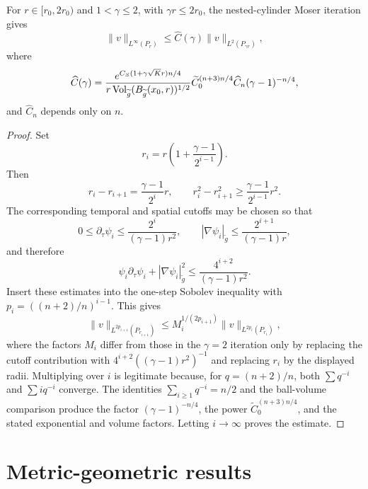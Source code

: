 \begin{proposition}
\label{prop:chow-iii-appj-solution-25-7}


For \(r\in[r_0,2r_0)\) and \(1<\gamma\leq2\), with
\(\gamma r\leq2r_0\), the nested-cylinder Moser iteration gives
\[
 \|v\|_{L^\infty(P_r)}\leq\widehat C(\gamma)
 \|v\|_{L^2(P_{\gamma r})},
\]
where
\[
 \widehat C(\gamma)=
 \frac{e^{C_S(1+\gamma\sqrt K r)n/4}}
 {r\operatorname{Vol}_{\widetilde g}(B_{\widetilde g}(x_0,r))^{1/2}}
 \widetilde C_0^{(n+3)n/4}\widehat C_n(\gamma-1)^{-n/4},
\]
and \(\widehat C_n\) depends only on \(n\).
\end{proposition}
\begin{proof}
\sketch
Set
\[
 r_i=r\left(1+\frac{\gamma-1}{2^{i-1}}\right).
\]
Then
\[
 r_i-r_{i+1}=\frac{\gamma-1}{2^i}r,
 \qquad
 r_i^2-r_{i+1}^2\geq\frac{\gamma-1}{2^{i-1}}r^2.
\]
The corresponding temporal and spatial cutoffs may be chosen so that
\[
 0\leq\partial_\tau\psi_i\leq
 \frac{2^i}{(\gamma-1)r^2},
 \qquad
 |\nabla\psi_i|_{\widetilde g}\leq
 \frac{2^{i+1}}{(\gamma-1)r},
\]
and therefore
\[
 \psi_i\partial_\tau\psi_i+|\nabla\psi_i|_{\widetilde g}^2
 \leq\frac{4^{i+2}}{(\gamma-1)r^2}.
\]
Insert these estimates into the one-step Sobolev inequality with
\(p_i=((n+2)/n)^{i-1}\).  This gives
\[
 \|v\|_{L^{2p_{i+1}}(P_{r_{i+1}})}
 \leq M_i^{1/(2p_{i+1})}
 \|v\|_{L^{2p_i}(P_{r_i})},
\]
where the factors \(M_i\) differ from those in the \(\gamma=2\) iteration
only by replacing the cutoff contribution with
\(4^{i+2}((\gamma-1)r^2)^{-1}\) and replacing \(r_i\) by the displayed
radii.  Multiplying over \(i\) is legitimate because, for
\(q=(n+2)/n\), both \(\sum q^{-i}\) and \(\sum iq^{-i}\) converge.
The identities \(\sum_{i\geq1}q^{-i}=n/2\) and the ball-volume comparison
produce the factor \((\gamma-1)^{-n/4}\), the power
\(\widetilde C_0^{(n+3)n/4}\), and the stated exponential and volume
factors.  Letting \(i\to\infty\) proves the estimate.
\end{proof}

\section{Metric-geometric results}

